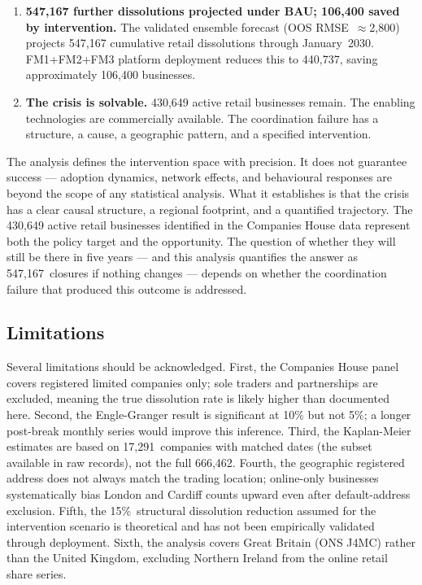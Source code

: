 \documentclass[12pt,a4paper]{article}
\begin{document}
\begin{enumerate}[leftmargin=*, label=\arabic*.]
\item \textbf{547,167 further dissolutions projected under BAU; 106,400 saved by
  intervention.}
  The validated ensemble forecast (OOS RMSE~$\approx$2,800) projects 547,167 cumulative
  retail dissolutions through January~2030. FM1+FM2+FM3 platform deployment reduces this
  to 440,737, saving approximately 106,400 businesses.

\item \textbf{The crisis is solvable.}
  430,649 active retail businesses remain. The enabling technologies are commercially
  available. The coordination failure has a structure, a cause, a geographic pattern,
  and a specified intervention.

\end{enumerate}

\bigskip

The analysis defines the intervention space with precision. It does not guarantee success
--- adoption dynamics, network effects, and behavioural responses are beyond the scope of
any statistical analysis. What it establishes is that the crisis has a clear causal
structure, a regional footprint, and a quantified trajectory. The 430,649 active retail
businesses identified in the Companies House data represent both the policy target and
the opportunity. The question of whether they will still be there in five years ---
and this analysis quantifies the answer as 547,167~closures if nothing changes ---
depends on whether the coordination failure that produced this outcome is addressed.

\subsection*{Limitations}

Several limitations should be acknowledged. First, the Companies House panel covers
registered limited companies only; sole traders and partnerships are excluded, meaning
the true dissolution rate is likely higher than documented here. Second, the
Engle-Granger result is significant at 10\% but not 5\%; a longer post-break monthly
series would improve this inference. Third, the Kaplan-Meier estimates are based on
17,291~companies with matched dates (the subset available in raw records), not the
full 666,462. Fourth, the geographic registered address does not always match the trading
location; online-only businesses systematically bias London and Cardiff counts upward
even after default-address exclusion. Fifth, the 15\%~structural dissolution reduction
assumed for the intervention scenario is theoretical and has not been empirically validated
through deployment. Sixth, the analysis covers Great Britain (ONS J4MC) rather than
the United Kingdom, excluding Northern Ireland from the online retail share series.
\end{document}
